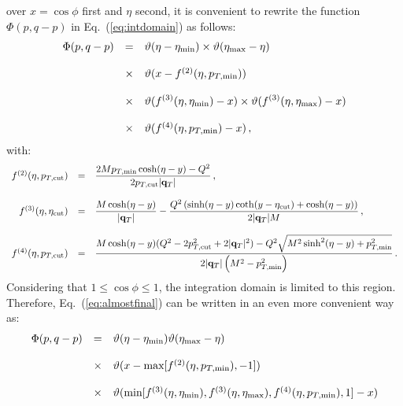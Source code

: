 \documentclass[10pt,a4paper]{article}
\begin{document}
over $x=\cos\phi$ first and $\eta$ second, it is convenient to rewrite
the function $\Phi(p,q-p)$ in Eq.~(\ref{eq:intdomain}) as follows:
\begin{equation}\label{eq:almostfinal}
\begin{array}{rcl}
\Phi(p,q-p) &=&\displaystyle \vartheta(\eta-\eta_{\rm min}) \times
\vartheta(\eta_{\rm max}-\eta) \\
\\
&\times& \vartheta(x - f^{(2)}(\eta,
                p_{T,\rm min})) \\
\\
&\times&\displaystyle
         \vartheta(f^{(3)}(\eta,\eta_{\rm min})-x) \times \vartheta(f^{(3)}(\eta,\eta_{\rm max})-x)\\
\\
&\times&\vartheta(f^{(4)}(\eta,
         p_{T,\rm min})-x)
         
         \,,
\end{array}
\end{equation}
with:
\begin{equation}\label{eq:relevantfuncs}
\begin{array}{rcl}
f^{(2)}(\eta, p_{T,\rm cut}) & = &\displaystyle \frac{2M p_{T,\rm min}\cosh(\eta-y) 
                    - Q^{2}}{2p_{T,\rm cut}
                    |\mathbf{q}_T|}\,, \\
\\
f^{(3)}(\eta,\eta_{\rm cut}) & = &\displaystyle \frac{M \cosh(\eta-y)}{|\mathbf{q}_T|
                    }-\frac{Q^{2} \left(\sinh(\eta
                                   -y)\coth(y-\eta_{\rm cut})+\cosh(\eta-y)\right)}{2|\mathbf{q}_T|  M}\,,\\
\\
f^{(4)}(\eta, p_{T,\rm cut}) & = &\displaystyle \frac{M \cosh(\eta-y)(Q^2 - 2
                    p_{T,\rm cut}^{2} + 2 |\mathbf{q}_T|^2)- Q^{2} \sqrt{M^{2} \sinh ^{2} (\eta-y) + p_{T,\rm min}^{2} }}{2 |\mathbf{q}_T| \left(M^{2} - p_{T,\rm min}^{2}\right)}\,.
\end{array}
\end{equation}
Considering that $1\leq\cos\phi\leq 1$, the integration domain is
limited to this region. Therefore, Eq.~(\ref{eq:almostfinal}) can be
written in an even more convenient way as:
\begin{equation}\label{eq:final}
\begin{array}{rcl}
\Phi(p,q-p) &=& \vartheta(\eta-\eta_{\rm min})\vartheta(\eta_{\rm
  max}-\eta)  \\
\\
&\times&\vartheta(x -
  \mbox{max}[f^{(2)}(\eta,p_{T,\rm min}),-1])\\
\\
&\times&\vartheta(\mbox{min}[f^{(3)}(\eta,\eta_{\rm min}),f^{(3)}(\eta,\eta_{\rm
         max}), f^{(4)}(\eta,p_{T,\rm
         min}),1]-x)
\end{array}
\end{equation}
\end{document}
